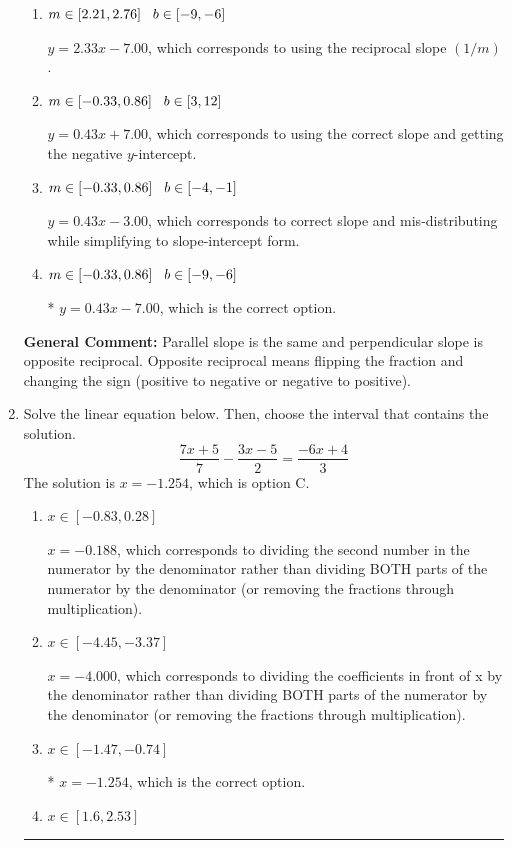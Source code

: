 \documentclass{extbook}[14pt]
\newcommand{\litem}[1]{\item #1

\rule{\textwidth}{0.4pt}}
\begin{document}
\begin{enumerate}
{\begin{enumerate}[label=\Alph*.]
 $y = -0.43x - 13.00$, which corresponds to using the negative slope.
\item \( m \in [2.21, 2.76] \hspace*{3mm} b \in [-9, -6] \)

 $y = 2.33x - 7.00$, which corresponds to using the reciprocal slope $(1/m)$.
\item \( m \in [-0.33, 0.86] \hspace*{3mm} b \in [3, 12] \)

 $y = 0.43x + 7.00$, which corresponds to using the correct slope and getting the negative $y$-intercept.
\item \( m \in [-0.33, 0.86] \hspace*{3mm} b \in [-4, -1] \)

 $y = 0.43x - 3.00$, which corresponds to correct slope and mis-distributing while simplifying to slope-intercept form.
\item \( m \in [-0.33, 0.86] \hspace*{3mm} b \in [-9, -6] \)

* $y = 0.43x - 7.00$, which is the correct option.
\end{enumerate}

\textbf{General Comment:} Parallel slope is the same and perpendicular slope is opposite reciprocal. Opposite reciprocal means flipping the fraction and changing the sign (positive to negative or negative to positive).
}
\litem{
Solve the linear equation below. Then, choose the interval that contains the solution.
\[ \frac{7x + 5}{7} - \frac{3x -5}{2} = \frac{-6x + 4}{3} \]The solution is \( x = -1.254 \), which is option C.\begin{enumerate}[label=\Alph*.]
\item \( x \in [-0.83, 0.28] \)

 $x = -0.188$, which corresponds to dividing the second number in the numerator by the denominator rather than dividing BOTH parts of the numerator by the denominator (or removing the fractions through multiplication).
\item \( x \in [-4.45, -3.37] \)

 $x = -4.000$, which corresponds to dividing the coefficients in front of x by the denominator rather than dividing BOTH parts of the numerator by the denominator (or removing the fractions through multiplication).
\item \( x \in [-1.47, -0.74] \)

* $x = -1.254$, which is the correct option.
\item \( x \in [1.6, 2.53] \)


\end{enumerate}}
\end{enumerate}
\end{document}
